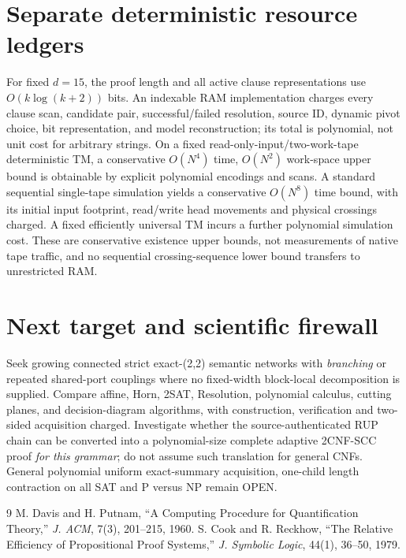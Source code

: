 \documentclass[11pt]{article}
\begin{document}
\section{Separate deterministic resource ledgers}
For fixed $d=15$, the proof length and all active clause representations use $O(k\log(k+2))$ bits. An indexable RAM implementation charges every clause scan, candidate pair, successful/failed resolution, source ID, dynamic pivot choice, bit representation, and model reconstruction; its total is polynomial, not unit cost for arbitrary strings. On a fixed read-only-input/two-work-tape deterministic TM, a conservative $O(N^4)$ time, $O(N^2)$ work-space upper bound is obtainable by explicit polynomial encodings and scans. A standard sequential single-tape simulation yields a conservative $O(N^8)$ time bound, with its initial input footprint, read/write head movements and physical crossings charged. A fixed efficiently universal TM incurs a further polynomial simulation cost. These are conservative existence upper bounds, not measurements of native tape traffic, and no sequential crossing-sequence lower bound transfers to unrestricted RAM.

\section{Next target and scientific firewall}
Seek growing connected strict exact-(2,2) semantic networks with \emph{branching} or repeated shared-port couplings where no fixed-width block-local decomposition is supplied. Compare affine, Horn, 2SAT, Resolution, polynomial calculus, cutting planes, and decision-diagram algorithms, with construction, verification and two-sided acquisition charged. Investigate whether the source-authenticated RUP chain can be converted into a polynomial-size complete adaptive 2CNF-SCC proof \emph{for this grammar}; do not assume such translation for general CNFs. General polynomial uniform exact-summary acquisition, one-child length contraction on all SAT and P versus NP remain OPEN.

\begin{thebibliography}{9}
 M. Davis and H. Putnam, ``A Computing Procedure for Quantification Theory,'' \emph{J. ACM}, 7(3), 201--215, 1960.
 S. Cook and R. Reckhow, ``The Relative Efficiency of Propositional Proof Systems,'' \emph{J. Symbolic Logic}, 44(1), 36--50, 1979.
\end{thebibliography}
\end{document}

